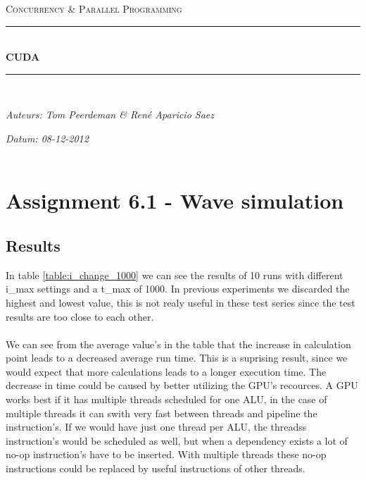 \documentclass[a4paper]{article}
\newcommand{\HRule}{\rule{\linewidth}{0.5mm}}
\begin{document}
	\begin{titlepage}
	\begin{center}
		\textsc{\Large Concurrency \& Parallel Programming}\\[0.5cm]
		\HRule \\[0,4cm]
		\textsc{\huge \bfseries CUDA}
		\HRule \\[8cm]
		\begin{minipage}{0.4\textwidth}
			\begin{flushleft}\large
				\emph{Auteurs: Tom Peerdeman \& Ren\'e Aparicio Saez}\\
			\end{flushleft}
		\end{minipage}
		\begin{minipage}{0.4\textwidth}
			\begin{flushright}\large
			\emph{Datum: 08-12-2012\\\hspace{1cm}}\\
			\end{flushright}
		\end{minipage}
	\end{center}
	\end{titlepage}

\section{Assignment 6.1 - Wave simulation}
  
	\subsection{Results}
		In table \ref{table:i_change_1000} we can see the results of 10 runs with different i\_max settings and a t\_max of 1000.
		In previous experiments we discarded the highest and lowest value, this is not realy useful in these test series since the test results are too close to each other.\\
		\\
		We can see from the average value's in the table that the increase in calculation point leads to a decreased average run time.
		This is a suprising result, since we would expect that more calculations leads to a longer execution time.
		The decrease in time could be caused by better utilizing the GPU's recources.
		A GPU works best if it has multiple threads scheduled for one ALU, in the case of multiple threads it can swith very fast between threads and pipeline the instruction's.
		If we would have just one thread per ALU, the threadss instruction's would be scheduled as well, but when a dependency exists a lot of no-op instruction's have to be inserted.
		With multiple threads these no-op instructions could be replaced by useful instructions of other threads.
		
\end{document}
